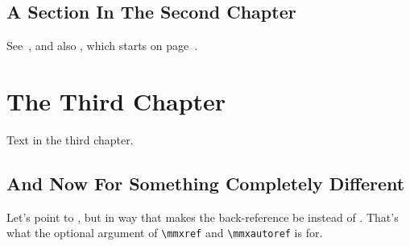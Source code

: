 \documentclass{report}
\begin{document}

\section{A Section In The Second Chapter}
 See~,
 and also , which starts
on page~.


\chapter{The Third Chapter}

Text in the third chapter.

\section{And Now For Something Completely Different}

Let's point to , but in way that
makes the back-reference be  instead of
. That's what the optional argument
of \verb|\mmxref| and \verb|\mmxautoref| is for.
\end{document}
